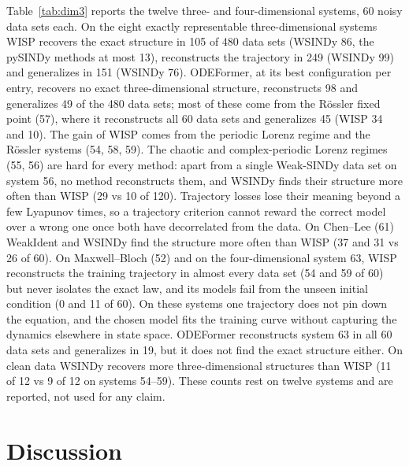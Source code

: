 \documentclass[10pt]{article}
\newcommand{\pv}[1]{\textcolor{prelim}{#1}}
\newcommand{\pv}[1]{#1}
\begin{document}
Table~\ref{tab:dim3} reports the twelve three- and four-dimensional systems, 60 noisy data sets each. On the eight
exactly representable three-dimensional systems WISP recovers the exact structure in \pv{105 of 480} data sets (WSINDy
\pv{86}, the pySINDy methods at most \pv{13}), reconstructs the trajectory in \pv{249} (WSINDy \pv{99}) and
generalizes in \pv{151} (WSINDy \pv{76}). ODEFormer, at its best configuration per entry, recovers no exact
three-dimensional structure, reconstructs \pv{98} and generalizes \pv{49} of the 480 data sets; most of these come from
the R\"ossler fixed point (57), where it reconstructs all 60 data sets and generalizes \pv{45} (WISP \pv{34} and
\pv{10}). The gain of WISP comes from the periodic Lorenz regime and the R\"ossler systems
(54, 58, 59). The chaotic and complex-periodic Lorenz regimes (55, 56) are hard for every method: apart from a single
Weak-SINDy data set on system 56, no method reconstructs them, and WSINDy finds their structure more often than WISP (\pv{29} vs \pv{10} of 120). Trajectory losses lose their
meaning beyond a few Lyapunov times, so a trajectory criterion cannot reward the correct model over a wrong one once
both have decorrelated from the data. On Chen--Lee (61) WeakIdent and WSINDy find the structure more often than WISP
(\pv{37} and \pv{31} vs \pv{26} of 60). On Maxwell--Bloch (52) and on the four-dimensional system 63, WISP
reconstructs the training trajectory in almost every data set (\pv{54} and \pv{59} of 60) but never isolates the exact
law, and its models fail from the unseen initial condition (\pv{0} and \pv{11} of 60). On these systems one trajectory
does not pin down the equation, and the chosen model fits the training curve without capturing the dynamics elsewhere
in state space. ODEFormer reconstructs
system 63 in all 60 data sets and generalizes in \pv{19}, but it does not find the exact structure either. On clean data WSINDy
recovers more three-dimensional structures than WISP (\pv{11 of 12 vs 9 of 12} on systems 54--59). These counts rest on
twelve systems and are reported, not used for any claim.

\section{Discussion}\label{sec:discussion}
\end{document}
